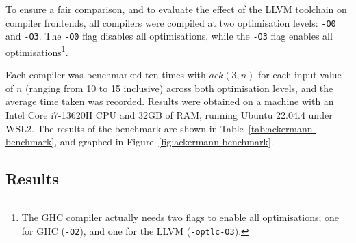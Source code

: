 To ensure a fair comparison, and to evaluate the effect of the LLVM toolchain on compiler frontends,
all compilers were compiled at two optimisation levels: \texttt{-O0} and \texttt{-O3}. The
\texttt{-O0} flag disables all optimisations, while the \texttt{-O3} flag enables all
optimisations\footnote{The GHC compiler actually needs two flags to enable all optimisations; one
for GHC (\texttt{-O2}), and one for the LLVM (\texttt{-optlc-O3}).}.

Each compiler was benchmarked ten times with $ack(3,n)$ for each input value of $n$ (ranging from 10
to 15 inclusive) across both optimisation levels, and the average time taken was recorded. Results
were obtained on a machine with an Intel Core i7-13620H CPU and 32GB of RAM, running Ubuntu 22.04.4
under WSL2. The results of the benchmark are shown in Table~\ref{tab:ackermann-benchmark}, and
graphed in Figure~\ref{fig:ackermann-benchmark}.


\subsection{Results}

